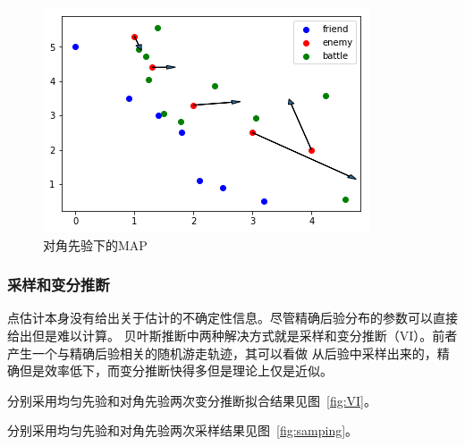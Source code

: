 \documentclass{sicnuthesis}
\begin{document}
\begin{figure}[htb]
\includegraphics[width=0.6\linewidth]{MAP2.png}
\caption{对角先验下的MAP}
\label{fig:MAPtwo}
\end{figure}

\subsubsection{采样和变分推断}


点估计本身没有给出关于估计的不确定性信息。尽管精确后验分布的参数可以直接给出但是难以计算。
贝叶斯推断中两种解决方式就是采样和变分推断（VI）。前者产生一个与精确后验相关的随机游走轨迹，其可以看做
从后验中采样出来的，精确但是效率低下，而变分推断快得多但是理论上仅是近似。

分别采用均匀先验和对角先验两次变分推断拟合结果见图~\ref{fig:VI}。

分别采用均匀先验和对角先验两次采样结果见图~\ref{fig:samping}。
\end{document}
